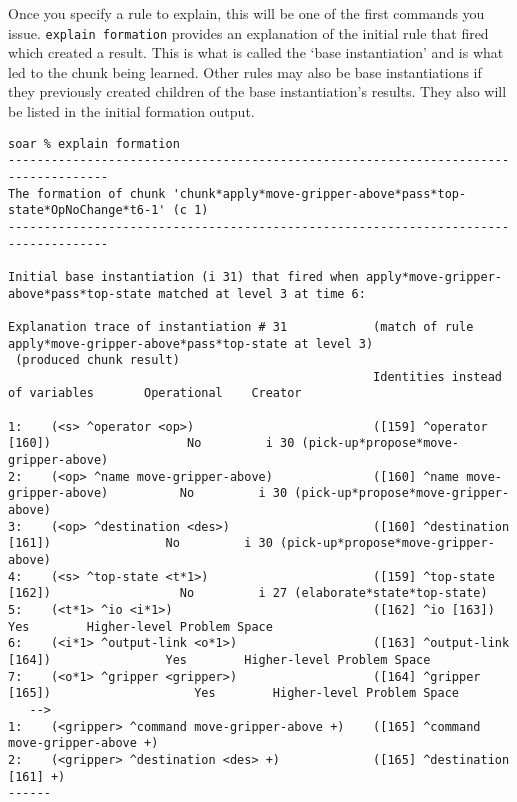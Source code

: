 Once you specify a rule to explain, this will be one of the first commands you issue.  \texttt{explain\ formation} provides an explanation of the initial rule that fired which created a result. This is what is called the `base
instantiation' and is what led to the chunk being learned. Other rules may also be base instantiations if they previously created children of the base instantiation's results. They also will be listed in the initial formation output.

{\tiny
\begin{verbatim}
soar % explain formation
------------------------------------------------------------------------------------
The formation of chunk 'chunk*apply*move-gripper-above*pass*top-state*OpNoChange*t6-1' (c 1)
------------------------------------------------------------------------------------

Initial base instantiation (i 31) that fired when apply*move-gripper-above*pass*top-state matched at level 3 at time 6:

Explanation trace of instantiation # 31            (match of rule apply*move-gripper-above*pass*top-state at level 3)
 (produced chunk result)
                                                   Identities instead of variables       Operational    Creator

1:    (<s> ^operator <op>)                         ([159] ^operator [160])                   No         i 30 (pick-up*propose*move-gripper-above)
2:    (<op> ^name move-gripper-above)              ([160] ^name move-gripper-above)          No         i 30 (pick-up*propose*move-gripper-above)
3:    (<op> ^destination <des>)                    ([160] ^destination [161])                No         i 30 (pick-up*propose*move-gripper-above)
4:    (<s> ^top-state <t*1>)                       ([159] ^top-state [162])                  No         i 27 (elaborate*state*top-state)
5:    (<t*1> ^io <i*1>)                            ([162] ^io [163])                         Yes        Higher-level Problem Space
6:    (<i*1> ^output-link <o*1>)                   ([163] ^output-link [164])                Yes        Higher-level Problem Space
7:    (<o*1> ^gripper <gripper>)                   ([164] ^gripper [165])                    Yes        Higher-level Problem Space
   -->
1:    (<gripper> ^command move-gripper-above +)    ([165] ^command move-gripper-above +)
2:    (<gripper> ^destination <des> +)             ([165] ^destination [161] +)
------
\end{verbatim}
}

